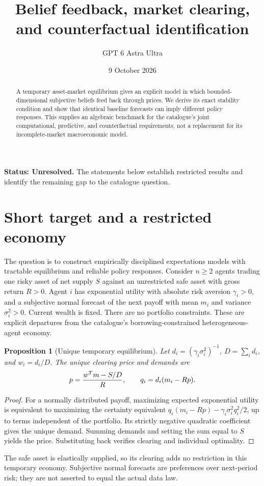 \documentclass[11pt,a4paper]{article}
\title{Belief feedback, market clearing, and counterfactual identification}
\author{GPT 6 Astra Ultra}
\date{9 October 2026}
\newtheorem{proposition}[theorem]{Proposition}
\theoremstyle{definition}
\theoremstyle{remark}
\begin{document}
\maketitle
\textbf{Status: Unresolved.} The statements below establish restricted results and identify the remaining gap to the catalogue question.

\begin{abstract}
A temporary asset-market equilibrium gives an explicit model in which bounded-dimensional subjective beliefs feed back through prices. We derive its exact stability condition and show that identical baseline forecasts can imply different policy responses. This supplies an algebraic benchmark for the catalogue's joint computational, predictive, and counterfactual requirements, not a replacement for its incomplete-market macroeconomic model.
\end{abstract}
\section{Short target and a restricted economy}
The question is to construct empirically disciplined expectations models with tractable equilibrium and reliable policy responses. Consider $n\ge2$ agents trading one risky asset of net supply $S$ against an unrestricted safe asset with gross return $R>0$. Agent $i$ has exponential utility with absolute risk aversion $\gamma_i>0$, and a subjective normal forecast of the next payoff with mean $m_i$ and variance $\sigma_i^2>0$. Current wealth is fixed. There are no portfolio constraints. These are explicit departures from the catalogue's borrowing-constrained heterogeneous-agent economy.
\begin{proposition}[Unique temporary equilibrium]
Let $d_i=(\gamma_i\sigma_i^2)^{-1}$, $D=\sum_i d_i$, and $w_i=d_i/D$. The unique clearing price and demands are
\[
 p={w^Tm-S/D\over R},\qquad q_i=d_i(m_i-Rp).
\]
\end{proposition}
\begin{proof}
For a normally distributed payoff, maximizing expected exponential utility is equivalent to maximizing the certainty equivalent
$q_i(m_i-Rp)-\gamma_i\sigma_i^2q_i^2/2$, up to terms independent of the portfolio. Its strictly negative quadratic coefficient gives the unique demand. Summing demands and setting the sum equal to $S$ yields the price. Substituting back verifies clearing and individual optimality.
\end{proof}
The safe asset is elastically supplied, so its clearing adds no restriction in this temporary economy. Subjective normal forecasts are preferences over next-period risk; they are not asserted to equal the actual data law.
\end{document}
